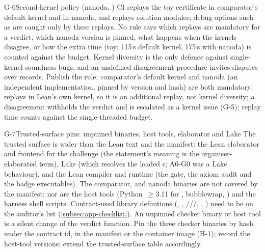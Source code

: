 \begin{issue}{G-6}{Second-kernel policy (nanoda, )}
\IRprob CI replays the toy certificate in comparator's default kernel and in nanoda, and
 replays solution modules; debug options such as  are
caught only by these replays. No rule says which replays are mandatory for a verdict, which nanoda
version is pinned, what happens when the kernels disagree, or how the extra time (toy: 115\,s
default kernel, 175\,s with nanoda) is counted against the budget.
\IRwhy Kernel diversity is the only defence against single-kernel soundness bugs, and an undefined
disagreement procedure invites disputes over records.
\IRres Publish the rule: comparator's default kernel and nanoda (an independent implementation,
pinned by version and hash) are both mandatory;  replays in Lean's own kernel, so it
is an additional replay, not kernel diversity; a disagreement withholds the verdict
and is escalated as a kernel issue (G-5); replay time counts against the single-threaded budget.
\end{issue}

\begin{issue}{G-7}{Trusted-surface pins: unpinned binaries, host tools, elaborator and Lake}
\IRprob The trusted surface is wider than the Lean text and the  manifest: the Lean
elaborator and frontend for the challenge (the statement's meaning is the organiser-elaborated term),
Lake (which resolves the loaded s; A6-G0 was a Lake behaviour), and the Lean compiler and
runtime (the gate, the axiom audit and the badge executables). The comparator,  and
nanoda binaries are not covered by the manifest; nor are the host tools (Python~$\ge$3.11 for
, bubblewrap, ) and the harness shell scripts. Contract-used library
definitions (\lean{![…]}, , ///,
, ) need to be on the auditor's list (\cref{subsec:app-checklist}).
\IRwhy An unpinned checker binary or host tool is a silent change of the verdict function.
\IRres Pin the three checker binaries by hash under the contract id, in the manifest or the container
image (H-1); record the host-tool versions; extend the trusted-surface table accordingly.
\end{issue}

